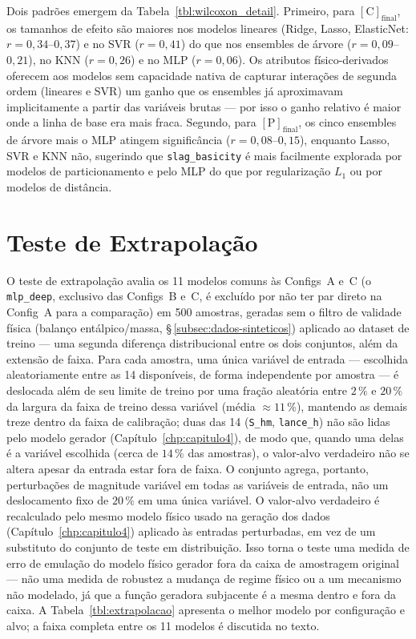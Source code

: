 Dois padrões emergem da Tabela~\ref{tbl:wilcoxon_detail}. Primeiro, para $[\text{C}]_\text{final}$, os tamanhos de efeito são maiores nos modelos lineares (Ridge, Lasso, ElasticNet: $r = 0{,}34$--$0{,}37$) e no SVR ($r = 0{,}41$) do que nos ensembles de árvore ($r = 0{,}09$--$0{,}21$), no KNN ($r = 0{,}26$) e no MLP ($r = 0{,}06$). Os atributos físico-derivados oferecem aos modelos sem capacidade nativa de capturar interações de segunda ordem (lineares e SVR) um ganho que os ensembles já aproximavam implicitamente a partir das variáveis brutas --- por isso o ganho relativo é maior onde a linha de base era mais fraca. Segundo, para $[\text{P}]_\text{final}$, os cinco ensembles de árvore mais o MLP atingem significância ($r = 0{,}08$--$0{,}15$), enquanto Lasso, SVR e KNN não, sugerindo que \texttt{slag\_basicity} é mais facilmente explorada por modelos de particionamento e pelo MLP do que por regularização $L_1$ ou por modelos de distância.


\section{Teste de Extrapolação}
\label{sec:extrapolacao}

O teste de extrapolação avalia os 11 modelos comuns às Configs~A e~C (o \texttt{mlp\_deep}, exclusivo das Configs~B e~C, é excluído por não ter par direto na Config~A para a comparação) em 500 amostras, geradas sem o filtro de validade física (balanço entálpico/massa, §\,\ref{subsec:dados-sinteticos}) aplicado ao dataset de treino --- uma segunda diferença distribucional entre os dois conjuntos, além da extensão de faixa. Para cada amostra, uma única variável de entrada --- escolhida aleatoriamente entre as 14 disponíveis, de forma independente por amostra --- é deslocada além de seu limite de treino por uma fração aleatória entre $2\,\%$ e $20\,\%$ da largura da faixa de treino dessa variável (média $\approx 11\,\%$), mantendo as demais treze dentro da faixa de calibração; duas das 14 (\texttt{S\_hm}, \texttt{lance\_h}) não são lidas pelo modelo gerador (Capítulo~\ref{chp:capitulo4}), de modo que, quando uma delas é a variável escolhida (cerca de $14\,\%$ das amostras), o valor-alvo verdadeiro não se altera apesar da entrada estar fora de faixa. O conjunto agrega, portanto, perturbações de magnitude variável em todas as variáveis de entrada, não um deslocamento fixo de $20\,\%$ em uma única variável. O valor-alvo verdadeiro é recalculado pelo mesmo modelo físico usado na geração dos dados (Capítulo~\ref{chp:capitulo4}) aplicado às entradas perturbadas, em vez de um substituto do conjunto de teste em distribuição. Isso torna o teste uma medida de erro de emulação do modelo físico gerador fora da caixa de amostragem original --- não uma medida de robustez a mudança de regime físico ou a um mecanismo não modelado, já que a função geradora subjacente é a mesma dentro e fora da caixa. A Tabela~\ref{tbl:extrapolacao} apresenta o melhor modelo por configuração e alvo; a faixa completa entre os 11 modelos é discutida no texto.

